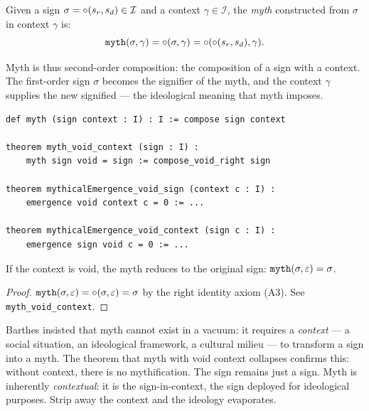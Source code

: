 \begin{definition}[Myth]
\label{def:myth}
Given a sign $\sigma = \circ(s_r, s_d) \in \mathcal{I}$ and a
context $\gamma \in \mathcal{I}$, the \emph{myth} constructed from
$\sigma$ in context $\gamma$ is:
\[
  \texttt{myth}(\sigma, \gamma) = \circ(\sigma, \gamma) =
  \circ(\circ(s_r, s_d), \gamma).
\]
\end{definition}

Myth is thus second-order composition: the composition of a sign with a
context. The first-order sign $\sigma$ becomes the signifier of the
myth, and the context $\gamma$ supplies the new signified --- the
ideological meaning that myth imposes.

\begin{lstlisting}[caption={Myth: second-order composition}]
def myth (sign context : I) : I := compose sign context

theorem myth_void_context (sign : I) :
    myth sign void = sign := compose_void_right sign

theorem mythicalEmergence_void_sign (context c : I) :
    emergence void context c = 0 := ...

theorem mythicalEmergence_void_context (sign c : I) :
    emergence sign void c = 0 := ...
\end{lstlisting}

\begin{theorem}
\label{thm:myth-void-context}
If the context is void, the myth reduces to the original sign:
$\texttt{myth}(\sigma, \varepsilon) = \sigma$.
\end{theorem}

\begin{proof}
$\texttt{myth}(\sigma, \varepsilon) = \circ(\sigma, \varepsilon) = \sigma$ by
the right identity axiom (A3). See \texttt{myth\_void\_context}.
\end{proof}

\begin{interpretation}
Barthes insisted that myth cannot exist in a vacuum: it requires a
\emph{context} --- a social situation, an ideological framework, a
cultural milieu --- to transform a sign into a myth. The theorem that
myth with void context collapses confirms this: without context, there
is no mythification. The sign remains just a sign. Myth is inherently
\emph{contextual}: it is the sign-in-context, the sign deployed for
ideological purposes. Strip away the context and the ideology
evaporates.
\end{interpretation}

